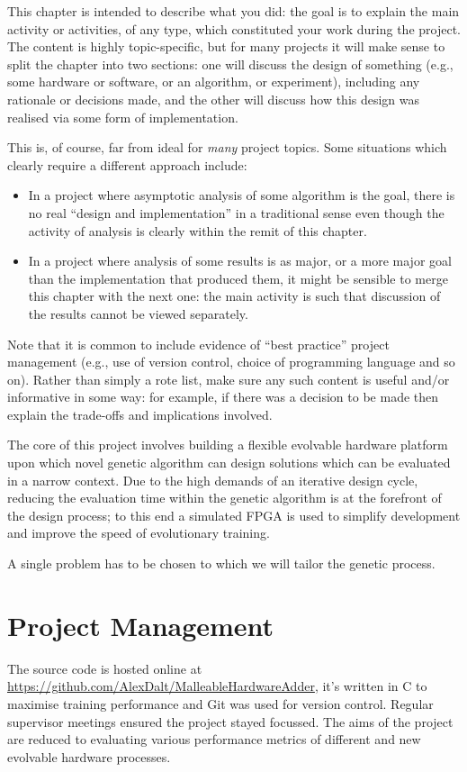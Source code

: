 {
\color{red}

This chapter is intended to describe what you did: the goal is to explain
the main activity or activities, of any type, which constituted your work
during the project.  The content is highly topic-specific, but for many
projects it will make sense to split the chapter into two sections: one
will discuss the design of something (e.g., some hardware or software, or
an algorithm, or experiment), including any rationale or decisions made,
and the other will discuss how this design was realised via some form of
implementation.

This is, of course, far from ideal for {\em many} project topics.  Some
situations which clearly require a different approach include:

\begin{itemize}
\item In a project where asymptotic analysis of some algorithm is the goal,
      there is no real ``design and implementation'' in a traditional sense
      even though the activity of analysis is clearly within the remit of
      this chapter.
\item In a project where analysis of some results is as major, or a more
      major goal than the implementation that produced them, it might be
      sensible to merge this chapter with the next one: the main activity
      is such that discussion of the results cannot be viewed separately.
\end{itemize}

\noindent
Note that it is common to include evidence of ``best practice'' project
management (e.g., use of version control, choice of programming language
and so on).  Rather than simply a rote list, make sure any such content
is useful and/or informative in some way: for example, if there was a
decision to be made then explain the trade-offs and implications
involved.
}

The core of this project involves building a flexible evolvable hardware
platform upon which novel genetic algorithm can design solutions which can be
evaluated in a narrow context. Due to the high demands of an iterative
design cycle, reducing the evaluation time within the genetic algorithm is
at the forefront of the design process; to this end a simulated FPGA is used
to simplify development and improve the speed of evolutionary training.

A single problem has to be chosen to which we will tailor the genetic process.

\section{Project Management}
The source code is hosted online at \url{https://github.com/AlexDalt/MalleableHardwareAdder},
it's written in C to maximise training performance and Git was used for version control.
Regular supervisor meetings ensured the project stayed focussed. The aims
of the project are reduced to evaluating various performance metrics of
different and new evolvable hardware processes.

